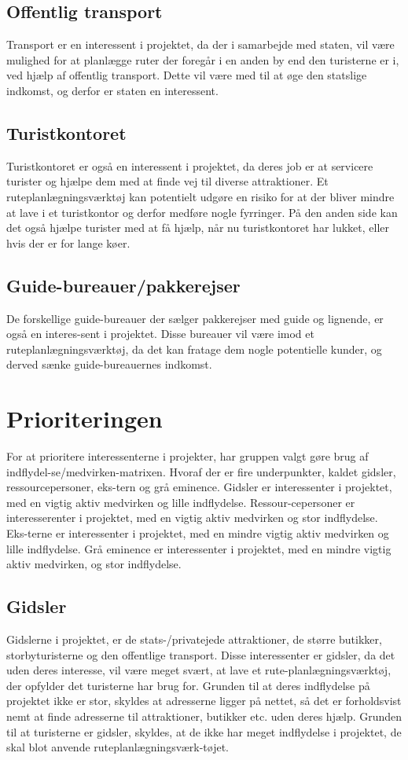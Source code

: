 \subsection{Offentlig transport}
Transport er en interessent i projektet, da der i samarbejde med staten, vil være mulighed for at planlægge ruter der foregår i en anden by end den turisterne er i, ved hjælp af offentlig transport. Dette vil være med til at øge den statslige indkomst, og derfor er staten en interessent. 

\subsection{Turistkontoret}
Turistkontoret er også en interessent i projektet, da deres job er at servicere turister og hjælpe dem med at finde vej til diverse attraktioner. Et ruteplanlægningsværktøj kan potentielt udgøre en risiko for at der bliver mindre at lave i et turistkontor og derfor medføre nogle fyrringer. På den anden side kan det også hjælpe turister med at få hjælp, når nu turistkontoret har lukket, eller hvis der er for lange køer. 

\subsection{Guide-bureauer/pakkerejser}
De forskellige guide-bureauer der sælger pakkerejser med guide og lignende, er også en interes-sent i projektet. Disse bureauer vil være imod et ruteplanlægningsværktøj, da det kan fratage dem nogle potentielle kunder, og derved sænke guide-bureauernes indkomst.   


\section{Prioriteringen}
For at prioritere interessenterne i projekter, har gruppen valgt gøre brug af indflydel-se/medvirken-matrixen. Hvoraf der er fire underpunkter, kaldet gidsler, ressourcepersoner, eks-tern og grå eminence.
Gidsler er interessenter i projektet, med en vigtig aktiv medvirken og lille indflydelse. Ressour-cepersoner er interesserenter i projektet, med en vigtig aktiv medvirken og stor indflydelse. Eks-terne er interessenter i projektet, med en mindre vigtig aktiv medvirken og lille indflydelse. Grå eminence er interessenter i projektet, med en mindre vigtig aktiv medvirken, og stor indflydelse.

\subsection{Gidsler}
Gidslerne i projektet, er de stats-/privatejede attraktioner, de større butikker, storbyturisterne og den offentlige transport.
Disse interessenter er gidsler, da det uden deres interesse, vil være meget svært, at lave et rute-planlægningsværktøj, der opfylder det turisterne har brug for. Grunden til at deres indflydelse på projektet ikke er stor, skyldes at adresserne ligger på nettet, så det er forholdsvist nemt at finde adresserne til attraktioner, butikker etc. uden deres hjælp. Grunden til at turisterne er gidsler, skyldes, at de ikke har meget indflydelse i projektet, de skal blot anvende ruteplanlægningsværk-tøjet.

